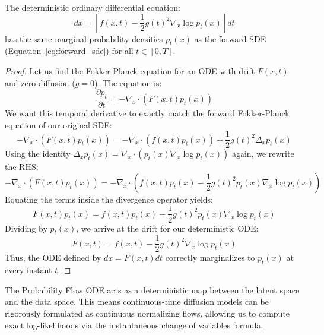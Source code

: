 \begin{theorem}
\label{thm:prob_flow}
The deterministic ordinary differential equation:
\begin{equation}
\label{eq:prob_flow_ode}
dx = \left[ f(x, t) - \frac{1}{2} g(t)^2 \nabla_x \log p_t(x) \right] dt
\end{equation}
has the same marginal probability densities $p_t(x)$ as the forward SDE (Equation~\ref{eq:forward_sde}) for all $t \in [0, T]$.
\end{theorem}
\begin{proof}
Let us find the Fokker-Planck equation for an ODE with drift $F(x, t)$ and zero diffusion ($g=0$).
The equation is:
\begin{equation}
\frac{\partial p_t}{\partial t} = -\nabla_x \cdot (F(x, t) p_t(x))
\end{equation}
We want this temporal derivative to exactly match the forward Fokker-Planck equation of our original SDE:
\begin{equation}
-\nabla_x \cdot (F(x, t) p_t(x)) = -\nabla_x \cdot (f(x, t) p_t(x)) + \frac{1}{2} g(t)^2 \Delta_x p_t(x)
\end{equation}
Using the identity $\Delta_x p_t(x) = \nabla_x \cdot (p_t(x) \nabla_x \log p_t(x))$ again, we rewrite the RHS:
\begin{equation}
-\nabla_x \cdot (F(x, t) p_t(x)) = -\nabla_x \cdot \left( f(x, t) p_t(x) - \frac{1}{2} g(t)^2 p_t(x) \nabla_x \log p_t(x) \right)
\end{equation}
Equating the terms inside the divergence operator yields:
\begin{equation}
F(x, t) p_t(x) = f(x, t) p_t(x) - \frac{1}{2} g(t)^2 p_t(x) \nabla_x \log p_t(x)
\end{equation}
Dividing by $p_t(x)$, we arrive at the drift for our deterministic ODE:
\begin{equation}
F(x, t) = f(x, t) - \frac{1}{2} g(t)^2 \nabla_x \log p_t(x)
\end{equation}
Thus, the ODE defined by $dx = F(x, t)dt$ correctly marginalizes to $p_t(x)$ at every instant $t$.
\end{proof}

The Probability Flow ODE acts as a deterministic map between the latent space and the data space. This means continuous-time diffusion models can be rigorously formulated as continuous normalizing flows, allowing us to compute exact log-likelihoods via the instantaneous change of variables formula.

